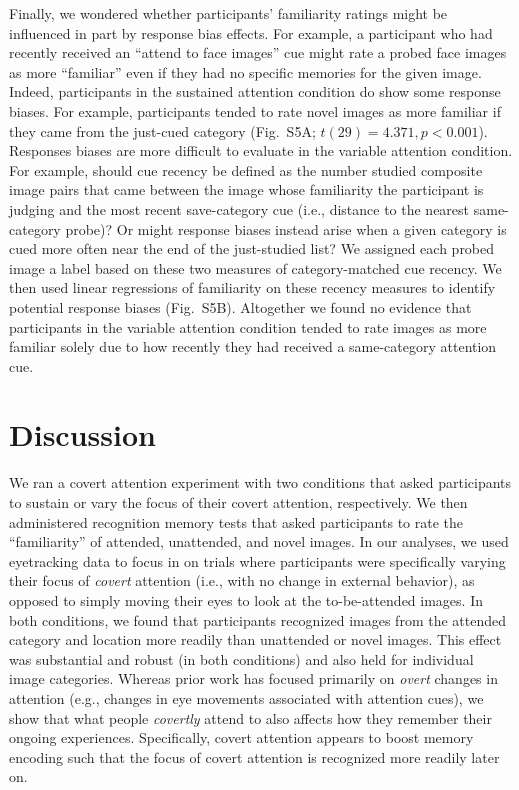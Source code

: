 \documentclass[english]{article}
\newcommand{\responseBias}{S5}
\begin{document}
Finally, we wondered whether participants' familiarity ratings might be
influenced in part by response bias effects. For example, a participant who had
recently received an ``attend to face images'' cue might rate a probed face
images as more ``familiar'' even if they had no specific memories for the given
image. Indeed, participants in the sustained attention condition do show some
response biases. For example, participants tended to rate novel images as more
familiar if they came from the just-cued category (Fig.~\responseBias A; $t(29)
= 4.371, p < 0.001$). Responses biases are more difficult to evaluate in the
variable attention condition. For example, should cue recency be defined as the
number studied composite image pairs that came between the image whose
familiarity the participant is judging and the most recent save-category cue
(i.e., distance to the nearest same-category probe)? Or might response biases
instead arise when a given category is cued more often near the end of the
just-studied list? We assigned each probed image a label based on these two
measures of category-matched cue recency. We then used linear regressions of
familiarity on these recency measures to identify potential response biases
(Fig.~\responseBias B). Altogether we found no evidence that participants in
the variable attention condition tended to rate images as more familiar solely
due to how recently they had received a same-category attention cue.

\section*{Discussion}

We ran a covert attention experiment with two conditions that asked
participants to sustain or vary the focus of their covert attention,
respectively. We then administered recognition memory tests that asked
participants to rate the ``familiarity'' of attended, unattended, and novel
images. In our analyses, we used eyetracking data to focus in on trials where
participants were specifically varying their focus of \textit{covert} attention
(i.e., with no change in external behavior), as opposed to simply moving their
eyes to look at the to-be-attended images. In both conditions, we found that
participants recognized images from the attended category and location more
readily than unattended or novel images. This effect was substantial and robust
(in both conditions) and also held for individual image categories. Whereas
prior work has focused primarily on \textit{overt} changes in attention (e.g.,
changes in eye movements associated with attention cues), we show that what
people \textit{covertly} attend to also affects how they remember their ongoing
experiences.  Specifically, covert attention appears to boost memory encoding
such that the focus of covert attention is recognized more readily later on.
\end{document}
